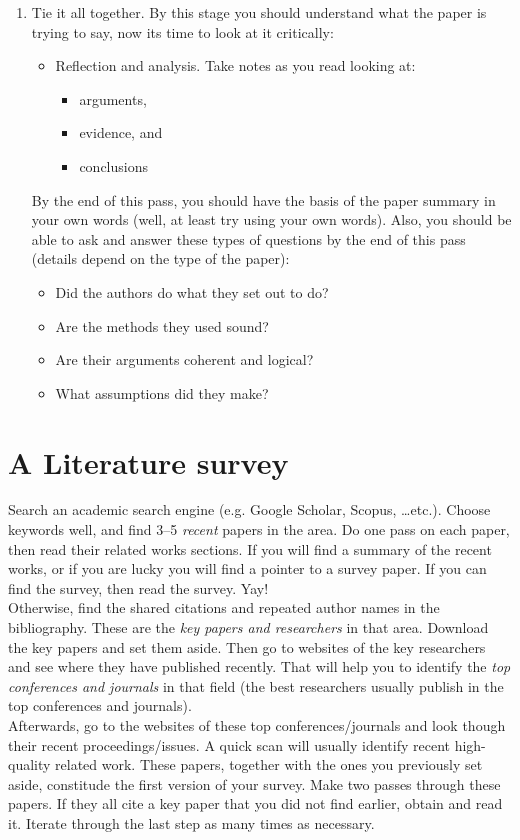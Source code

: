\documentclass[a4paper]{article}
\begin{document}
\begin{enumerate}
  \item Tie it all together. By this stage you should understand what the paper is trying to say, now its time to look at it critically:
  \renewcommand{\labelitemi}{$\square$}
  	\begin{itemize}
		\item Reflection and analysis. Take notes as you read looking at:
			\begin{itemize}
			\item arguments,
			\item evidence, and
			\item conclusions
			\end{itemize}
	\end{itemize}
   By the end of this pass, you should have the basis of the paper summary in your own words (well, at least try using your own words). Also, you should be able to ask and answer these types of questions by the end of this pass (details depend on the type of the paper):
   \renewcommand{\labelitemi}{\textbullet}
   \begin{itemize}
   \item Did the authors do what they set out to do?
   \item Are the methods they used sound?
   \item Are their arguments coherent and logical?
   \item What assumptions did they make?
   \end{itemize}

\end{enumerate}


\section{A Literature survey}
\label{sec:2}
Search an academic search engine (e.g. Google Scholar, Scopus, \ldots etc.). Choose keywords well, and find 3--5 \emph{recent} papers in the area. Do one pass on each paper, then read their related works sections. If you will find a summary of the recent works, or if you are lucky you will find a pointer to a survey paper. If you can find the survey, then read the survey. Yay!\\

Otherwise, find the shared citations and repeated author names in the bibliography. These are the \emph{key papers and researchers} in that area. Download the key papers and set them aside. Then go to websites of the key researchers and see where they have published recently. That will help you to identify the \emph{top conferences and journals} in that field (the best researchers usually publish in the top conferences and journals).\\

Afterwards, go to the websites of these top conferences/journals and look though their recent proceedings/issues. A quick scan will usually identify recent high-quality related work. These papers, together with the ones you previously set aside, constitude the first version of your survey. Make two passes through these papers. If they all cite a key paper that you did not find earlier, obtain and read it. Iterate through the last step as many times as necessary.
\end{document}
